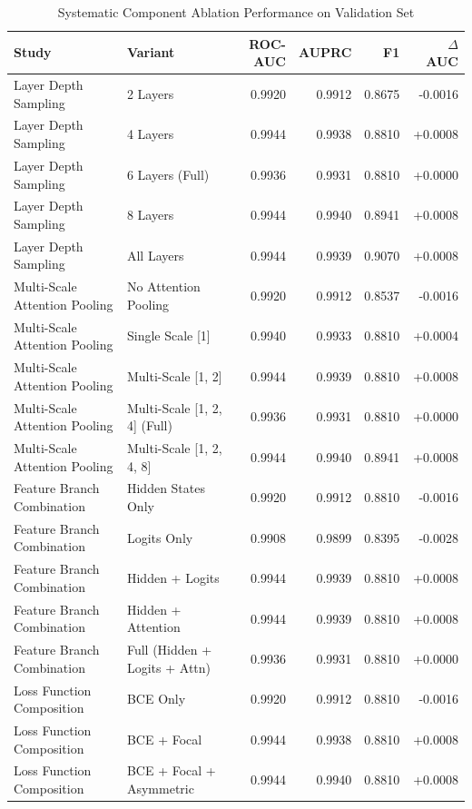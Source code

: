 \begin{table}[htbp]
\caption{Systematic Component Ablation Performance on Validation Set}
\begin{center}
\begin{tabular}{llrrrr}
\toprule
\textbf{Study} & \textbf{Variant} & \textbf{ROC-AUC} & \textbf{AUPRC} & \textbf{F1} & \textbf{$\Delta$ AUC} \\
\midrule
Layer Depth Sampling & 2 Layers & 0.9920 & 0.9912 & 0.8675 & -0.0016 \\
Layer Depth Sampling & 4 Layers & 0.9944 & 0.9938 & 0.8810 & +0.0008 \\
Layer Depth Sampling & 6 Layers (Full) & 0.9936 & 0.9931 & 0.8810 & +0.0000 \\
Layer Depth Sampling & 8 Layers & 0.9944 & 0.9940 & 0.8941 & +0.0008 \\
Layer Depth Sampling & All Layers & 0.9944 & 0.9939 & 0.9070 & +0.0008 \\
Multi-Scale Attention Pooling & No Attention Pooling & 0.9920 & 0.9912 & 0.8537 & -0.0016 \\
Multi-Scale Attention Pooling & Single Scale [1] & 0.9940 & 0.9933 & 0.8810 & +0.0004 \\
Multi-Scale Attention Pooling & Multi-Scale [1, 2] & 0.9944 & 0.9939 & 0.8810 & +0.0008 \\
Multi-Scale Attention Pooling & Multi-Scale [1, 2, 4] (Full) & 0.9936 & 0.9931 & 0.8810 & +0.0000 \\
Multi-Scale Attention Pooling & Multi-Scale [1, 2, 4, 8] & 0.9944 & 0.9940 & 0.8941 & +0.0008 \\
Feature Branch Combination & Hidden States Only & 0.9920 & 0.9912 & 0.8810 & -0.0016 \\
Feature Branch Combination & Logits Only & 0.9908 & 0.9899 & 0.8395 & -0.0028 \\
Feature Branch Combination & Hidden + Logits & 0.9944 & 0.9939 & 0.8810 & +0.0008 \\
Feature Branch Combination & Hidden + Attention & 0.9944 & 0.9939 & 0.8810 & +0.0008 \\
Feature Branch Combination & Full (Hidden + Logits + Attn) & 0.9936 & 0.9931 & 0.8810 & +0.0000 \\
Loss Function Composition & BCE Only & 0.9920 & 0.9912 & 0.8810 & -0.0016 \\
Loss Function Composition & BCE + Focal & 0.9944 & 0.9938 & 0.8810 & +0.0008 \\
Loss Function Composition & BCE + Focal + Asymmetric & 0.9944 & 0.9940 & 0.8810 & +0.0008 \\

\end{tabular}
\end{center}
\end{table}
